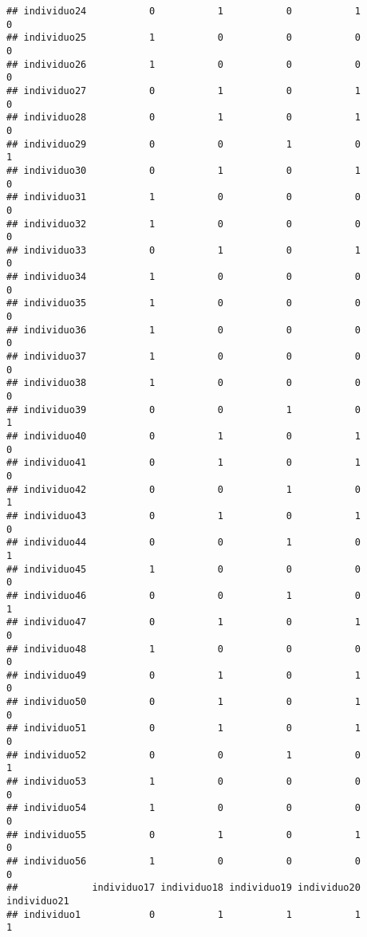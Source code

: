 \documentclass[
]{article}
\begin{document}
\begin{verbatim}
## individuo24           0           1           0           1           0
## individuo25           1           0           0           0           0
## individuo26           1           0           0           0           0
## individuo27           0           1           0           1           0
## individuo28           0           1           0           1           0
## individuo29           0           0           1           0           1
## individuo30           0           1           0           1           0
## individuo31           1           0           0           0           0
## individuo32           1           0           0           0           0
## individuo33           0           1           0           1           0
## individuo34           1           0           0           0           0
## individuo35           1           0           0           0           0
## individuo36           1           0           0           0           0
## individuo37           1           0           0           0           0
## individuo38           1           0           0           0           0
## individuo39           0           0           1           0           1
## individuo40           0           1           0           1           0
## individuo41           0           1           0           1           0
## individuo42           0           0           1           0           1
## individuo43           0           1           0           1           0
## individuo44           0           0           1           0           1
## individuo45           1           0           0           0           0
## individuo46           0           0           1           0           1
## individuo47           0           1           0           1           0
## individuo48           1           0           0           0           0
## individuo49           0           1           0           1           0
## individuo50           0           1           0           1           0
## individuo51           0           1           0           1           0
## individuo52           0           0           1           0           1
## individuo53           1           0           0           0           0
## individuo54           1           0           0           0           0
## individuo55           0           1           0           1           0
## individuo56           1           0           0           0           0
##             individuo17 individuo18 individuo19 individuo20 individuo21
## individuo1            0           1           1           1           1

\end{verbatim}
\end{document}
